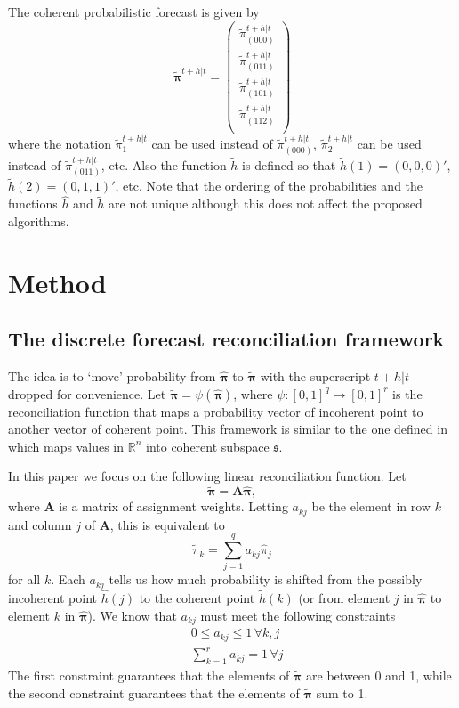 \documentclass[a4paper,review,12pt,authoryear]{elsarticle}
\newcommand{\bpi}{\bm{\pi}}
\begin{document}
    The coherent probabilistic forecast is given by
    \[
    \tilde{\bpi}^{t+h|t}=\begin{pmatrix}
    \tilde{\pi}^{t+h|t}_{(000)}\\
    \tilde{\pi}^{t+h|t}_{(011)}\\
    \tilde{\pi}^{t+h|t}_{(101)}\\
    \tilde{\pi}^{t+h|t}_{(112)}\\
    \end{pmatrix}
    \]
    where the notation $\tilde{\pi}^{t+h|t}_{1}$ can be used instead of $\tilde{\pi}^{t+h|t}_{(000)}$, $\tilde{\pi}^{t+h|t}_{2}$ can be used instead of $\tilde{\pi}^{t+h|t}_{(011)}$, etc. Also the function $\tilde{h}$ is defined so that $\tilde{h}(1)=(0,0,0)'$, $\tilde{h}(2)=(0,1,1)'$, etc. Note that the ordering of the probabilities and the functions $\hat{h}$ and $\tilde{h}$ are not unique although this does not affect the proposed algorithms.
    
\section{Method}
\label{sec:method}

    \subsection{The discrete forecast reconciliation framework}
    
    The idea is to `move' probability from $\hat{\bpi}$ to $\tilde{\bpi}$ with the superscript $t+h|t$ dropped for convenience.  
    Let $\tilde{\bpi} = \psi(\hat{\bpi})$, where $\psi:[0,1]^q \rightarrow [0,1]^r$ is the reconciliation function that maps a probability vector of incoherent point to another vector of coherent point. 
    This framework is similar to the one defined in \cite{anagiotelisForecastReconciliationGeometric2021} which maps values in $\mathbb{R}^n$ into coherent subspace $\mathfrak{s}$.

    In this paper we focus on the following linear reconciliation function.
    Let
    \begin{equation}
      \label{eq:framework}
    \tilde{\bpi}=\bm{A}\hat{\bpi},
    \end{equation}
    where $\bm{A}$ is a matrix of assignment weights. Letting $a_{kj}$ be the element in row $k$ and column $j$ of $\bm{A}$, this is equivalent to
    \[
      \tilde{\pi}_k=\sum\limits_{j=1}^q a_{kj}\hat{{\pi}}_j
    \]
    for all $k$. 
    Each $a_{kj}$ tells us how much probability is shifted from the possibly incoherent point $\hat{h}(j)$ to the coherent point $\tilde{h}(k)$ (or from element $j$ in $\hat{\bpi}$ to element $k$ in $\hat{\bpi}$). We know that $a_{kj}$ must meet the following constraints
    \begin{align*}
    &0\leq a_{kj} \leq 1 \,\forall k, j\\ 
    &\sum\limits_{k=1}^r a_{kj} = 1 \,\forall j 
    \end{align*}
    The first constraint guarantees that the elements of $\tilde{\bpi}$ are between 0 and 1, while the second constraint guarantees that the elements of $\tilde{\bpi}$ sum to 1.
    
\end{document}
